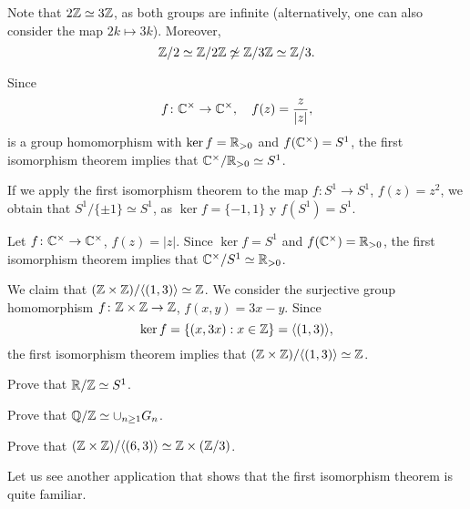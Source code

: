 \begin{example}
Note that $2\mathbb{Z}\simeq 3\mathbb{Z}$, as both groups are infinite (alternatively, one can also consider the map $2k\mapsto 3k$). Moreover, 
\[
\mathbb{Z}/2\simeq\mathbb{Z}/2\mathbb{Z}\not\simeq\mathbb{Z}/3\mathbb{Z}\simeq\mathbb{Z}/3.
\]
\end{example}

\begin{example}
Since 
\[
f\colon\mathbb{C}^\times\to\mathbb{C}^\times,
\quad
f(z)=\frac{z}{|z|},
\]
is a group homomorphism with $\ker f=\mathbb{R}_{>0}$ and
$f(\mathbb{C}^\times)=S^1$, the first isomorphism theorem 
implies that 
$\mathbb{C}^\times/\mathbb{R}_{>0}\simeq S^1$.
\end{example}

\begin{example}
If we apply the first isomorphism theorem to the
map $f\colon S^1\to S^1$, $f(z)=z^2$, we obtain that 
$S^1/\{\pm1\}\simeq S^1$, as 
$\ker f=\{-1,1\}$ y $f(S^1)=S^1$.
\end{example}

\begin{example}
Let $f\colon\mathbb{C}^\times\to\mathbb{C}^\times$, $f(z)=|z|$. Since $\ker f=S^1$ and $f(\mathbb{C}^\times)=\mathbb{R}_{>0}$, the first isomorphism theorem 
implies that $\mathbb{C}^\times/S^1\simeq\mathbb{R}_{>0}$.
\end{example}

\begin{example}
We claim that 
$(\mathbb{Z}\times\mathbb{Z})/\langle (1,3)\rangle\simeq\mathbb{Z}$. We consider
the surjective group homomorphism 
$f\colon\mathbb{Z}\times\mathbb{Z}\to\mathbb{Z}$, $f(x,y)=3x-y$. Since 
\[
\ker f=\{(x,3x):x\in\mathbb{Z}\}=\langle (1,3)\rangle,
\]
the first isomorphism theorem implies that 
$(\mathbb{Z}\times\mathbb{Z})/\langle (1,3)\rangle\simeq\mathbb{Z}$.
\end{example}

\begin{exercise}
Prove that $\mathbb{R}/\mathbb{Z}\simeq S^1$.
\end{exercise}



\begin{exercise}
Prove that $\mathbb{Q}/\mathbb{Z}\simeq\cup_{n\geq1}G_n$.
\end{exercise}


\begin{exercise}
Prove that 
$(\mathbb{Z}\times\mathbb{Z})/\langle (6,3)\rangle\simeq\mathbb{Z}\times(\mathbb{Z}/3)$.
\end{exercise}

Let us see another application that shows that
the first isomorphism theorem is quite familiar. 

